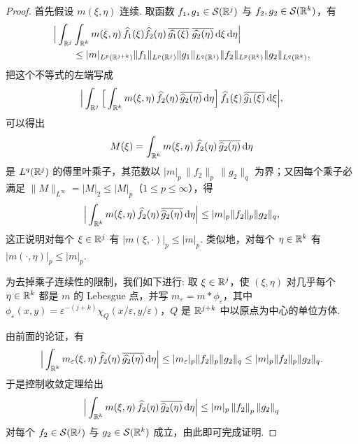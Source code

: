 \begin{proof}
首先假设 $m(\xi, \eta)$ 连续. 取函数 $f_1, g_1 \in \mathcal{S}(\mathbb{R}^j)$ 与 $f_2, g_2 \in \mathcal{S}(\mathbb{R}^k)$，有
\begin{align*}
  &\Big|\int_{\mathbb{R}^{j}}\int_{\mathbb{R}^{k}}m(\xi,\eta)\,\widehat{f_{1}}(\xi)\widehat{f_{2}}(\eta)\,
   \overline{\widehat{g_{1}}(\xi)}\;\overline{\widehat{g_{2}}(\eta)}\,\mathrm{d}\xi\,\mathrm{d}\eta\Big|\\
  &\qquad\leq|m|_{L^{p}(\mathbb{R}^{j+k})}\|f_{1}\|_{L^{p}(\mathbb{R}^{j})}\|g_{1}\|_{L^{q}(\mathbb{R}^{j})}
   \|f_{2}\|_{L^{p}(\mathbb{R}^{k})}\|g_{2}\|_{L^{q}(\mathbb{R}^{k})},
\end{align*}
把这个不等式的左端写成
\begin{align*}
  \Big|\int_{\mathbb{R}^{j}}\Big[\int_{\mathbb{R}^{k}}m(\xi,\eta)\,\widehat{f}_{2}(\eta)\,\overline{\widehat{g}_{2}(\eta)}\,\mathrm{d}\eta\Big]\,
  \widehat{f}_{1}(\xi)\,\overline{\widehat{g}_{1}(\xi)}\,\mathrm{d}\xi\Big|,
\end{align*}
可以得出
\begin{align*}
  M(\xi)=\int_{\mathbb{R}^{k}}m(\xi,\eta)\,\widehat{f}_{2}(\eta)\,\overline{\widehat{g}_{2}(\eta)}\,\mathrm{d}\eta
\end{align*}
是 $L^q(\mathbb{R}^j)$ 的傅里叶乘子，其范数以 $|m|_p\,\|f_2\|_p\,\|g_2\|_q$ 为界；又因每个乘子必满足 $\|M\|_{L^\infty} = |M|_2 \leq |M|_p$（$1 \leq p \leq \infty$），得
\begin{align*}
  \Big|\int_{\mathbb{R}^{k}}m(\xi,\eta)\,\widehat{f}_{2}(\eta)\,\overline{\widehat{g}_{2}(\eta)}\,\mathrm{d}\eta\Big|
  \leq|m|_{p}\|f_{2}\|_{p}\|g_{2}\|_{q},
\end{align*}
这正说明对每个 $\xi \in \mathbb{R}^j$ 有 $|m(\xi,\cdot)|_p \leq |m|_p$. 类似地，对每个 $\eta \in \mathbb{R}^k$ 有 $|m(\cdot,\eta)|_p \leq |m|_p$.

为去掉乘子连续性的限制，我们如下进行: 取 $\xi \in \mathbb{R}^j$，使 $(\xi, \eta)$ 对几乎每个 $\eta \in \mathbb{R}^k$ 都是 $m$ 的 Lebesgue 点，并写 $m_\varepsilon = m * \phi_\varepsilon$，其中 $\phi_\varepsilon(x, y) = \varepsilon^{-(j+k)} \chi_Q(x/\varepsilon, y/\varepsilon)$，$Q$ 是 $\mathbb{R}^{j+k}$ 中以原点为中心的单位方体.

由前面的论证，有
\begin{align*}
  \Big|\int_{\mathbb{R}^{k}}m_{\varepsilon}(\xi,\eta)\,\widehat{f_{2}}(\eta)\,\overline{\widehat{g_{2}}(\eta)}\,\mathrm{d}\eta\Big|
  \leq|m_{\varepsilon}|_{p}\|f_{2}\|_{p}\|g_{2}\|_{q}
  \leq|m|_{p}\|f_{2}\|_{p}\|g_{2}\|_{q}.
\end{align*}
于是控制收敛定理给出
\begin{align*}
  \Big|\int_{\mathbb{R}^{k}}m(\xi,\eta)\,\widehat{f}_{2}(\eta)\,\overline{\widehat{g}_{2}(\eta)}\,\mathrm{d}\eta\Big|
  \leq|m|_{p}\left\|f_{2}\right\|_{p}\left\|g_{2}\right\|_{q}
\end{align*}
对每个 $f_2 \in \mathcal{S}(\mathbb{R}^j)$ 与 $g_2 \in \mathcal{S}(\mathbb{R}^k)$ 成立，由此即可完成证明.
\end{proof}

